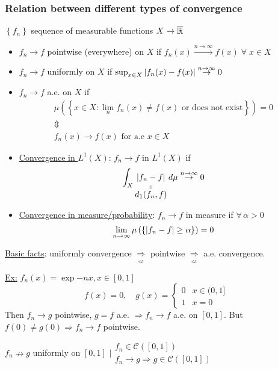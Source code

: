 \subsubsection*{Relation between different types of convergence}
\(\left\lbrace f_n \right\rbrace\) sequence of measurable functions \(X \to \barreal\)
\begin{itemize}
    \item \(f_n \to f\) pointwise (everywhere) on \(X\) if \(f_n(x) \overset{n \to \infty}{\to} f(x) \; \forall \; x \in X\)
    \item \(f_n \to f\) uniformly on \(X\) if \(\sup_{x \in X} \abs{f_n(x) - f(x)} \overset{n \to \infty}{\to} 0\)
    \item \(f_n \to f\) a.e. on \(X\) if 
    \[
        \begin{array}{c}
            \mu\left(\left\{ x \in X : \lim_n f_n(x) \neq f(x) \mbox{ or does not exist} \right\}\right) = 0 \\
            \Updownarrow \\
            f_n(x) \to f(x) \mbox{ for a.e } x \in X
        \end{array}
    \]
    \item \underline{Convergence in \(L^1(X)\)}: \(f_n \to f\) in \(L^1(X)\) if 
    \[
        \int_X \stackbelow{\abs{f_n - f}}{d_1(f_n, f)} \, d\mu \overset{n\to \infty}{\to} 0
    \]
    \item \underline{Convergence in measure/probability}: \(f_n \to f\) in measure if \(\forall \, \alpha > 0\)
    \[
        \lim_{n\to \infty} \mu\left(\left\{ \abs{f_n - f} \geq \alpha \right\}\right) = 0
    \]
\end{itemize}
\noindent\underline{Basic facts}: uniformly convergence \(\underset{\displaystyle\nLeftarrow}{\Rightarrow}\) pointwise \(\underset{\displaystyle\nLeftarrow}{\Rightarrow}\) a.e. convergence.

\noindent\underline{Ex:} \(f_n (x) = \exp{-nx}, x \in [0,1]\)
\[
    f(x) = 0, \quad g(x) = \begin{cases}
        0 & x \in (0, 1]\\ 1 & x = 0
    \end{cases}
\]
Then \(f_n \to g\) pointwise, \(g = f\) a.e. \(\Rightarrow f_n \to f\) a.e. on \([0,1]\). But \(f(0) \neq g(0) \Rightarrow f_n \to f\) pointwise. 

\(f_n \nrightarrow g\) uniformly on \([0,1]\) \(\bigg\lvert \begin{array}{l}
    f_n \in \mathcal{C}([0,1]) \\ f_n \to g \Rightarrow g \in \mathcal{C}([0,1])
\end{array}\)

